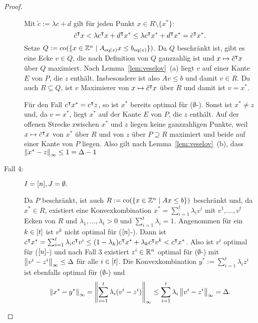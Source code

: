 \begin{proof}
\begin{description}
		Mit $\tilde{c}:=\lambda c+d$ gilt für jeden Punkt $x\in R\setminus\{x^*\}$:
		$$\tilde{c}^\intercal x < \lambda c^\intercal x + d^\intercal x^*\leq \lambda c^\intercal x^* + d^\intercal x^* = \tilde{c}^\intercal x^*.$$
		Setze $Q:=\operatorname{co}(\{x\in\mathbb{Z}^n \mid A_{\operatorname{eq}(z)}x \leq b_{\operatorname{eq}(z)} \})$.
		Da $Q$ beschränkt  ist, gibt es eine Ecke $v\in Q$, die nach Definition von $Q$ ganzzahlig ist und $x\mapsto\tilde{c}^\intercal x$ über $Q$ maximiert.
		Nach Lemma~\ref{lem:veselov}~(a) liegt $v$ auf einer Kante $E$ von $P$, die $z$ enthält.
		Insbesondere ist also $Av\leq b$ und damit $v\in R$.
		Da auch $R \subseteq Q$, ist $v$ Maximierer von $x\mapsto \tilde{c}^\intercal x$ über $R$ und damit ist $v=x^*$.
		
		Für den Fall $c^\intercal x^*=c^\intercal z$, so ist $x^*$ bereits optimal für ($\emptyset$-\MIPI).
		Sonst ist $x^* \neq z$ und, da $v=x^*$, liegt $x^*$ auf der Kante $E$ von $P$, die $z$ enthält.
		Auf der offenen Strecke zwischen $x^*$ und $z$ liegen keine ganzzahligen Punkte, weil $x\mapsto \tilde{c}^\intercal x$ von $x^*$ über $R$ und von $z$ über $P\supseteq R$ maximiert und beide auf einer Kante von $P$ liegen.
		Also gilt nach Lemma~\ref{lem:veselov}~(b), dass $\left\lVert x^*-z\right\rVert_\infty\leq 1 = \Delta -1 $
		
		\item[Fall 4:] $I=[n],J=\emptyset.$
		
		Da $P$ beschränkt, ist auch $R:=\operatorname{co}(\{x\in\mathbb{Z}^n \mid Ax\leq b\})$ beschränkt und, da $x^*\in R$, existiert eine Konvexkombination $x^* = \sum_{i=1}^t \lambda_i v^i$ mit $v^1,\dots,v^t$ Ecken von $R$ und $\lambda_1,\dots,\lambda_t>0$ und $\sum_{i=1}^t \lambda_i=1$.
		Angenommen für ein $k\in[t]$ ist $v^k$ nicht optimal für ($[n]$-\MIPI).
		Dann ist $c^\intercal x^*=\sum_{i=1}^t \lambda_i c^\intercal v^i \leq (1-\lambda_k)c^\intercal x^* + \lambda_k c^\intercal v^k < c^\intercal x^*$.
		Also ist $v^i$ optimal für ($[n]$-\MIPI) und nach Fall 3 existiert $z^i\in\mathbb{R}^n$ optimal für ($\emptyset$-\MIPI) mit $\left\lVert v^i-z^i\right\rVert_\infty\leq \Delta$ für alle $i\in[t]$.
		Die Konvexkombination $y^*:=\sum_{i=1}^t \lambda_i z^i$ ist ebenfalls optimal für ($\emptyset$-\MIPI) und
		$$\left\lVert x^*-y^*\right\rVert_\infty=\left\lVert\sum_{i=1}^t \lambda_i (v^i-z^i)\right\rVert_\infty\leq \sum_{i=1}^t \lambda_i \left\lVert v^i-z^i\right\rVert_\infty=\Delta.$$
	\end{description}
\end{proof}